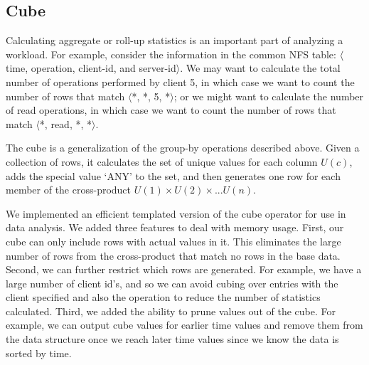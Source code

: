
\subsection{Cube}

Calculating aggregate or roll-up statistics is an important part of
analyzing a workload.  For example, consider the information in the
common NFS table: $\langle$time, operation, client-id, and
server-id$\rangle$.  We may want to calculate the total number of
operations performed by client 5, in which case we want to count the
number of rows that match $\langle$*, *, 5, *$\rangle$; or we might
want to calculate the number of read operations, in which case we want
to count the number of rows that match $\langle$*, read, *,
*$\rangle$.

The cube\cite{gray97cube} is a generalization of the group-by
operations described above.  Given a collection of rows, it calculates
the set of unique values for each column $U(c)$, adds the special
value `ANY' to the set, and then generates one row for each member of
the cross-product $U(1) \times U(2) \times ... U(n)$.

We implemented an efficient templated version of the cube operator for
use in data analysis.  We added three features to deal with memory
usage.  First, our cube can only include rows with actual values in
it.  This eliminates the large number of rows from the cross-product
that match no rows in the base data.  Second, we can further restrict
which rows are generated.  For example, we have a large number of
client id's, and so we can avoid cubing over entries with the client
specified and also the operation to reduce the number of statistics
calculated.  Third, we added the ability to prune values out of the
cube. For example, we can output cube values for earlier time values
and remove them from the data structure once we reach later time
values since we know the data is sorted by time.

